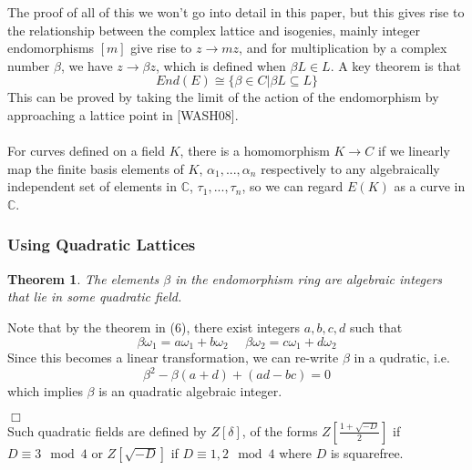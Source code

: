 \documentclass[12pt,twoside]{article}
\newenvironment{proof}{\noindent{\bf Proof:} \hspace*{1mm}}{
	\hspace*{\fill} $\Box$ }
\newtheorem{theorem}{Theorem}
\begin{document}
 
\noindent The proof of all of this we won't go into detail in this paper, but this gives rise to the relationship between the complex lattice and isogenies, mainly integer endomorphisms $[m]$ give rise to $ z \rightarrow mz$, and for multiplication by a complex number $\beta$, we have $z \rightarrow \beta z$, which is defined when $\beta L \in L$. A key theorem is that 
\begin{equation}
End(E) \cong \{ \beta \in C | \beta L \subseteq L \} 
\end{equation}  
This can be proved by taking the limit of the action of the endomorphism by approaching a lattice point in [WASH08].
\\ \\
\noindent For curves defined on a field $K$, there is a homomorphism $K \rightarrow C$ if we linearly map the finite basis elements of $K$, $\alpha_{1}, ...,\alpha_{n}$ respectively to any algebraically independent set of elements in $\mathbb{C}$, $\tau_{1},..., \tau_{n}$, so we can regard $E(K)$ as a curve in $\mathbb{C}$.  

\subsubsection{Using Quadratic Lattices}
\begin{theorem}
The elements $\beta$ in the endomorphism ring are algebraic integers that lie in some quadratic field.
\end{theorem}
\begin{proof}
Note that by the theorem in (6), there exist integers $a,b,c,d$ such that 
\begin{equation}
\beta \omega_{1} = a\omega_{1} + b \omega_{2} \> \> \> \> \> \> \beta \omega_{2} = c\omega_{1} + d \omega_{2}
\end{equation}
Since this becomes a linear transformation, we can re-write $\beta$ in a qudratic, i.e. 
\begin{equation}
\beta^{2} -  \beta(a+d) + (ad-bc) = 0
\end{equation}
which implies $\beta$ is an quadratic algebraic integer. 
\end{proof}
\\


Such quadratic fields are defined by $Z[\delta]$, of the forms $Z[\frac{1 + \sqrt{-D}}{2}]$ if $D \equiv 3 \mod 4$  or $Z[\sqrt{-D}]$ if $D \equiv 1,2 \mod 4$ where $D$ is squarefree.
\\ \\ 
\end{document}
